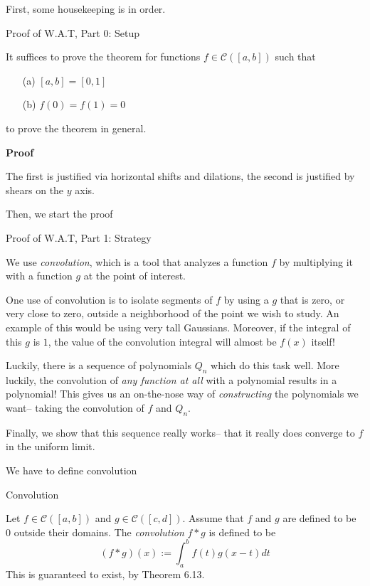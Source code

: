 First, some housekeeping is in order.

\begin{theorem} Proof of W.A.T, Part 0: Setup

    It suffices to prove the theorem for functions $f \in \mathscr{C}([a, b])$ such that 
    \begin{itemize}
        \item[(a)] $[a, b] = [0,1]$
        \item[(b)] $f(0) = f(1) = 0$
    \end{itemize}
    to prove the theorem in general.

    \textbf{Proof}

     The first is justified via horizontal shifts and dilations, the second is justified by shears on the $y$ axis. 
\end{theorem}

Then, we start the proof

\begin{plan} Proof of W.A.T, Part 1: Strategy

    We use \textit{convolution}, which is a tool that analyzes a function $f$ by multiplying it with a function $g$ at the point of interest. 

    One use of convolution is to isolate segments of $f$ by using a $g$ that is zero, or very close to zero, outside a neighborhood of the point we wish to study. An example of this would be using very tall Gaussians. Moreover, if the integral of this $g$ is $1$, the value of the convolution integral will almost be $f(x)$ itself!

    Luckily, there is a sequence of polynomials $Q_n$ which do this task well. More luckily, the convolution of \textit{any function at all} with a polynomial results in a polynomial! This gives us an on-the-nose way of \textit{constructing} the polynomials we want-- taking the convolution of $f$ and $Q_n$.
    
    Finally, we show that this sequence really works-- that it really does converge to $f$ in the uniform limit.
\end{plan}

We have to define convolution

\begin{definition} Convolution

    Let $f \in \mathscr{C}([a,b])$ and $g \in \mathscr{C}([c, d])$. Assume that $f$ and $g$ are defined to be $0$ outside their domains. The \textit{convolution} $f \ast g$ is defined to be
    \[(f \ast g)(x) := \int_a^b f(t)g(x-t) dt\]
    This is guaranteed to exist, by Theorem 6.13. 
\end{definition}

